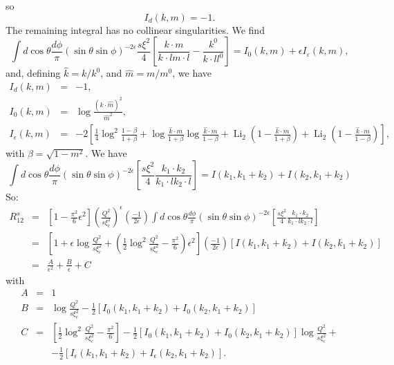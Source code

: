 \documentclass{letter}
\newcommand{\tmop}[1]{\ensuremath{\operatorname{#1}}}
\begin{document}
so
\begin{equation}
  I_d (k, m) = - 1 .
\end{equation}
The remaining integral has no collinear singularities. We find
\begin{equation}
  \int d \cos \theta \frac{d \phi}{\pi} (\sin \theta \sin \phi)^{- 2 \epsilon}
  \frac{s \xi^2}{4} \left[ \frac{k \cdot m}{k_{} \cdot l m \cdot l} -
  \frac{k^0}{k \cdot l l^0} \right] = I_0 (k, m) + \epsilon I_{\varepsilon}
  (k, m),
\end{equation}
and, defining $\hat{k} = k / k^0$, and $\hat{m} = m / m^0$, we have
\begin{eqnarray}
  I_d (k, m) & = & - 1, \\
  I_0 (k, m) & = & \log \frac{( \hat{k} \cdot \hat{m})^2}{\hat{m}^2}, \\
  I_{\epsilon} (k, m) & = & - 2 \left[ \frac{1}{4} \log^2  \frac{1 - \beta}{1
  + \beta} + \log \frac{\hat{k} \cdot m}{1 + \beta} \log \frac{\hat{k} \cdot
  m}{1 - \beta} + \tmop{Li}_2 \left( 1 - \frac{\hat{k} \cdot m}{1 + \beta}
  \right) + \tmop{Li}_2 \left( 1 - \frac{\hat{k} \cdot m}{1 - \beta} \right)
  \right], 
\end{eqnarray}
with $\beta = \sqrt{1 - m^2}$. We have
\begin{equation}
  \int d \cos \theta \frac{d \phi}{\pi} (\sin \theta \sin \phi)^{- 2 \epsilon}
  \left[ \frac{s \xi^2}{4} \frac{k_1 \cdot k_2}{k_1 \cdot l k_2 \cdot l}
  \right] = I (k_1, k_1 + k_2) + I (k_2, k_1 + k_2)
\end{equation}
So:
\begin{eqnarray}
  R^s_{12}  & = & \left[ 1 - \frac{\pi^2}{6} \epsilon^2 \right] \left(
  \frac{Q^2}{s \xi_c^2} \right)^{\epsilon} \left( \frac{- 1}{2 \epsilon}
  \right) \int d \cos \theta \frac{d \phi}{\pi} (\sin \theta \sin \phi)^{- 2
  \epsilon}  \left[ \frac{s \xi^2}{4} \frac{k_1 \cdot k_2}{k_1 \cdot l k_2
  \cdot l} \right] \nonumber\\
  & = & \left[ 1 + \epsilon \log \frac{Q^2}{s \xi_c^2} + \left( \frac{1}{2}
  \log^2 \frac{Q^2}{s \xi_c^2} - \frac{\pi^2}{6} \right) \epsilon^2 \right]
  \left( \frac{- 1}{2 \epsilon} \right) \left[ I (k_1, k_1 + k_2) + I (k_2,
  k_1 + k_2) \right] \nonumber\\
  & = & \frac{A}{\epsilon^2} + \frac{B}{\epsilon} + C 
\end{eqnarray}
with
\begin{eqnarray}
  A & = & 1 \\
  B & = & \log \frac{Q^2}{s \xi_c^2} - \frac{1}{2} \left[ I_0 (k_1, k_1 + k_2)
  + I_0 (k_2, k_1 + k_2) \right] \\
  C & = & \left[ \frac{1}{2} \log^2 \frac{Q^2}{s \xi_c^2} - \frac{\pi^2}{6}
  \right] - \frac{1}{2} \left[ I_0 (k_1, k_1 + k_2) + I_0 (k_2, k_1 + k_2)
  \right] \log \frac{Q^2}{s \xi_c^2} + \nonumber\\
  &  & - \frac{1}{2} \left[ I_{\epsilon} (k_1, k_1 + k_2) + I_{\epsilon}
  (k_2, k_1 + k_2) \right] . 
\end{eqnarray}
\end{document}
